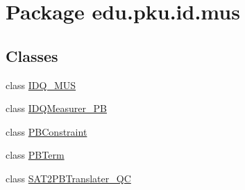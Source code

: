 \hypertarget{namespaceedu_1_1pku_1_1id_1_1mus}{
\section{Package edu.pku.id.mus}
\label{namespaceedu_1_1pku_1_1id_1_1mus}
}
\subsection*{Classes}
\begin{DoxyCompactItemize}
\item 
class \hyperlink{classedu_1_1pku_1_1id_1_1mus_1_1_i_d_q___m_u_s}{IDQ\_\-MUS}
\item 
class \hyperlink{classedu_1_1pku_1_1id_1_1mus_1_1_i_d_q_measurer___p_b}{IDQMeasurer\_\-PB}
\item 
class \hyperlink{classedu_1_1pku_1_1id_1_1mus_1_1_p_b_constraint}{PBConstraint}
\item 
class \hyperlink{classedu_1_1pku_1_1id_1_1mus_1_1_p_b_term}{PBTerm}
\item 
class \hyperlink{classedu_1_1pku_1_1id_1_1mus_1_1_s_a_t2_p_b_translater___q_c}{SAT2PBTranslater\_\-QC}
\end{DoxyCompactItemize}
